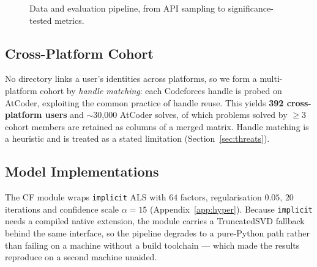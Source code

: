 \documentclass[12pt,a4paper]{article}
\begin{document}
\begin{figure}[h]
\centering
{}
\caption{Data and evaluation pipeline, from API sampling to significance-tested metrics.}
\label{fig:pipeline}
\end{figure}

\subsection{Cross-Platform Cohort}
\label{sec:impl-cohort}
No directory links a user's identities across platforms, so we form a multi-platform
cohort by \emph{handle matching}: each Codeforces handle is probed on AtCoder, exploiting
the common practice of handle reuse. This yields \textbf{392 cross-platform users} and $\sim$30{,}000 AtCoder solves, of which
problems solved by $\geq3$ cohort members are retained as columns of a merged matrix.
Handle matching is a heuristic and is treated as a stated limitation
(Section~\ref{sec:threats}).

\subsection{Model Implementations}
\label{sec:impl-models}
The CF module wraps \texttt{implicit} ALS with $64$ factors, regularisation $0.05$, $20$
iterations and confidence scale $\alpha=15$ (Appendix~\ref{app:hyper}). Because
\texttt{implicit} needs a compiled native extension, the module carries a TruncatedSVD
fallback behind the same interface, so the pipeline degrades to a pure-Python path rather
than failing on a machine without a build toolchain --- which made the results reproduce
on a second machine unaided.
\end{document}
